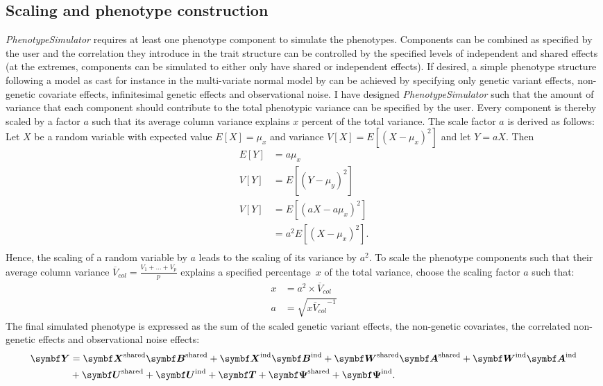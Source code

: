 \subsection{Scaling and phenotype construction}
\textit{PhenotypeSimulator} requires at least one phenotype component to simulate the phenotypes. Components can be combined as specified by the user and the correlation they introduce in the trait structure can be controlled by the specified levels of independent and shared effects (at the extremes, components can be simulated to either only have shared or independent effects). If desired, a simple phenotype structure following a model as cast for instance in the multi-variate normal model by \citep{Zhou2014} can be achieved by specifying only genetic variant effects, non-genetic covariate effects, infinitesimal genetic effects and observational noise.
%
I have designed \textit{PhenotypeSimulator} such that the amount of variance that each component should contribute to the total phenotypic variance can be specified by the user. Every component is thereby scaled by a factor \(a\) such that its average column variance explains \(x\) percent of the total variance. The scale factor \(a\) is derived as follows: 
Let \(X\) be a random variable with expected value \(E[X] = \mu_{x}\) and variance \(V[X] = E[(X - \mu_{x})^2]\) and let  \(Y = aX\). Then
\begin{equation}
\begin{aligned}
E[Y] &= a\mu_{x} \\
V[Y] &= E[(Y - \mu_{y})^2] \\
V[Y] &= E[(aX - a\mu_{x})^2] \\
		&= a^2 E[(X - \mu_{x})^2]. \\
\end{aligned}
\end{equation}
%
Hence, the scaling of a random variable by \(a\) leads to the scaling of its variance by \(a^2\). To scale the phenotype components such that their average column variance \(\overline{V}_{col} = \frac{V_1 + ... + V_p}{p} \) explains a specified percentage~\(x\) of the total variance, choose the scaling factor \(a\) such that: 
\begin{equation}
\begin{aligned}
x  &= a^2 \times \overline{V}_{col} \\
a  &= \sqrt{x{\overline{V}_{col}}^{-1}}
\end{aligned}
\end{equation}
%
The final simulated phenotype   is expressed as the sum of the scaled genetic variant effects, the non-genetic covariates, the correlated non-genetic effects and observational noise effects:
\begin{equation}
\begin{aligned}
\mat{Y} &= \matsup{X}{shared}\matsup{B}{shared}  + \matsup{X}{ind}\matsup{B}{ind} + \matsup{W}{shared} \matsup{A}{shared} + \matsup{W}{ind}\matsup{A}{ind} \\
&+ \matsup{U}{shared} + \matsup{U}{ind} + \mat{T} + \matsup{\Psi}{shared} +  \matsup{\Psi}{ind} .
\end{aligned}
\end{equation}
%
